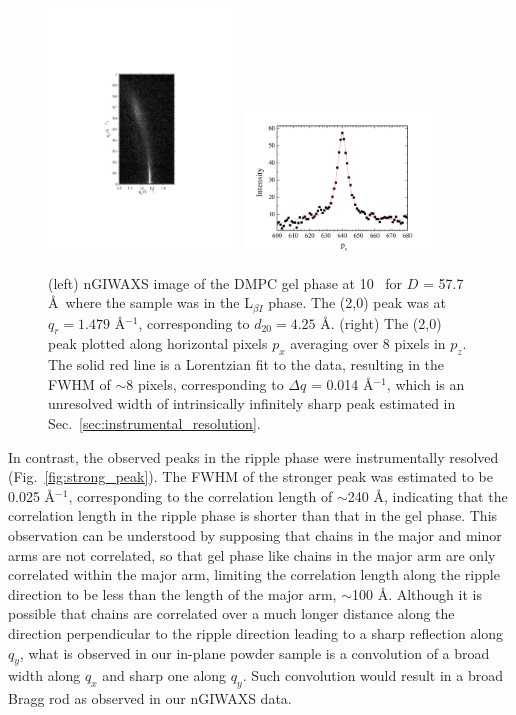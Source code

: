 \begin{figure}[htbp]
  \centering
  \includegraphics[trim=150 190 150 180,clip,width=0.45\textwidth]{figures/ripple/nGIWAXS/dmpc1_107}
  \includegraphics[trim=50 0 50 0,clip,width=0.45\textwidth]{figures/ripple/nGIWAXS/dmpc1_107_gel_phase_20_swath_8px}
  \caption[nGIWAXS of the DMPC gel phase]{(left) nGIWAXS image of the DMPC gel phase
  at 10 \textcelsius\ for $D$ = 57.7 \AA\ where the sample was in the 
  L$_{\beta I}$ phase. The (2,0) peak was at
  $q_r=1.479$ \AA$^{-1}$, corresponding to $d_{20}=4.25$ \AA.
  (right) The (2,0) peak plotted along horizontal pixels $p_x$ averaging over 8
  pixels in $p_z$. The solid red
  line is a Lorentzian fit to the data, resulting in the FWHM of $\sim$8 pixels,
  corresponding to $\Delta q$ = 0.014 \AA$^{-1}$,
  which is an unresolved width of intrinsically infinitely sharp peak
  estimated in Sec.~\ref{sec:instrumental_resolution}.}
  \label{fig:gel_phase}  
\end{figure}

In contrast, the observed peaks in the ripple phase were instrumentally 
resolved (Fig.~\ref{fig:strong_peak}). 
The FWHM of the stronger peak was estimated to be 0.025 \AA$^{-1}$,
corresponding to the correlation length of $\sim$240 \AA,
indicating that the correlation length in the ripple phase is shorter 
than that in the gel phase.
This observation can be understood by supposing that chains in the major
and minor arms are not correlated, so that gel phase like chains in the 
major arm are only correlated within the major arm, limiting the correlation
length along the ripple direction to be less than the length of the major 
arm, $\sim$100 \AA. Although
it is possible that chains are correlated over a much longer distance 
along the direction perpendicular to the ripple direction leading to
a sharp reflection along $q_y$,
what is observed in our in-plane powder sample is a convolution
of a broad width along $q_x$ and sharp one along $q_y$. Such convolution
would result in a broad Bragg rod as observed in our nGIWAXS data. 

